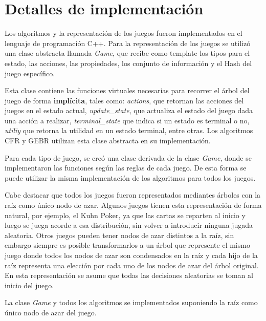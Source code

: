 \section{Detalles de implementación}
Los algoritmos y la representación de los juegos fueron implementados en el lenguaje de programación C++. Para la representación de los juegos se utilizó una clase abstracta llamada \textit{Game}, que recibe como template los tipos para el estado, las acciones, las propiedades, los conjunto de información y el Hash del juego específico.

Esta clase contiene las funciones virtuales necesarias para recorrer el árbol del juego de forma \textbf{implícita}, tales como: \textit{actions}, que retornan las acciones del juegos en el estado actual, \textit{update\_state}, que actualiza el estado del juego dada una acción a realizar, \textit{terminal\_state} que indica si un estado es terminal o no, \textit{utiliy} que retorna la utilidad en un estado terminal, entre otras. Los algoritmos CFR y GEBR utilizan esta clase abstracta en su implementación.

Para cada tipo de juego, se creó una clase derivada de la clase \textit{Game}, donde se implementaron las funciones según las reglas de cada juego. De esta forma se puede utilizar la misma implementación de los algoritmos para todos los juegos.

Cabe destacar que todos los juegos fueron representados mediantes árboles con la raíz como único nodo de azar. Algunos juegos tienen esta representación de forma natural, por ejemplo, el Kuhn Poker, ya que las cartas se reparten al inicio y luego se juega acorde a esa distribución, sin volver a introducir ninguna jugada aleatoria. Otros juegos pueden tener nodos de azar distintos a la raíz, sin embargo siempre es posible transformarlos a un árbol que represente el mismo juego donde todos los nodos de azar son condensados en la raíz y cada hijo de la raíz representa una elección por cada uno de los nodos de azar del árbol original. En esta representación se asume que todas las decisiones aleatorias se toman al inicio del juego.

La clase \textit{Game} y todos los algoritmos se implementados suponiendo la raíz como único nodo de azar del juego.